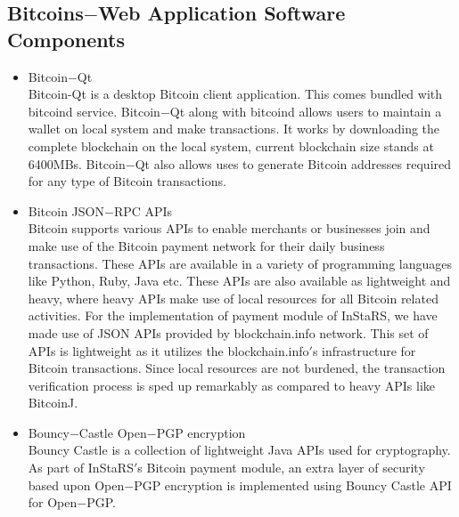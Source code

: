 \documentclass[a4page,12pt]{article}
\begin{document}
\subsection{Bitcoins$-$Web Application Software Components}
\begin{itemize}
\item Bitcoin$-$Qt\\
Bitcoin-Qt is a desktop Bitcoin client application. This comes bundled with bitcoind service. Bitcoin$-$Qt along with bitcoind allows users to maintain a wallet on local system and make transactions. It works by downloading the complete blockchain on the local system, current blockchain size stands at 6400MBs. Bitcoin$-$Qt also allows uses to generate Bitcoin addresses required for any type of Bitcoin transactions.
\item Bitcoin JSON$-$RPC APIs\\
Bitcoin supports various APIs to enable merchants or businesses join and make use of the Bitcoin payment network for their daily business transactions. These APIs are available in a variety of programming languages like Python, Ruby, Java etc. These APIs are also available as lightweight and heavy, where heavy APIs make use of local resources for all Bitcoin related activities. For the implementation of payment module of InStaRS, we have made use of JSON APIs provided by blockchain.info network. This set of APIs is lightweight as it utilizes the blockchain.info$'$s infrastructure for Bitcoin transactions. Since local resources are not burdened, the transaction verification process is sped up remarkably as compared to heavy APIs like BitcoinJ. 
\item Bouncy$-$Castle Open$-$PGP encryption\\
Bouncy Castle is a collection of lightweight Java APIs used for cryptography. As part of InStaRS$'$s Bitcoin payment module, an extra layer of security based upon Open$-$PGP encryption is implemented using Bouncy Castle API for Open$-$PGP.
\end{itemize}
\end{document}
